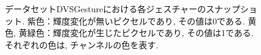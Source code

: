 \begin{figure}[htbp]
    \begin{minipage}{0.45\textwidth}
        \centering
        
    \end{minipage}
    \hspace{0.01\textwidth}
    \begin{minipage}{0.45\textwidth}
        \centering
        
    \end{minipage}

    \begin{minipage}{0.45\textwidth}
        \centering
        
    \end{minipage}


    \caption[データセットDVSGestureにおける各ジェスチャーのスナップショット]{
        データセットDVSGestureにおける各ジェスチャーのスナップショット.
        紫色：輝度変化が無いピクセルであり, その値は0である.
        黄色, 黄緑色：輝度変化が生じたピクセルであり, その値は1である. 
        それぞれの色は, チャンネルの色を表す.
    }
    \label{fig:dvs:gesture}
\end{figure}